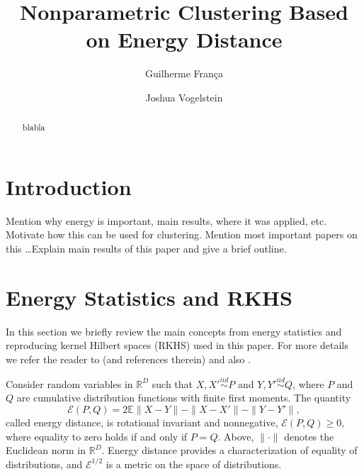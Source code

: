 \documentclass[aps,preprint,nofootinbib,floatfix]{revtex4-1}
\def\Energy{\mathcal{E}}
\def\E{\mathbb{E}}
\begin{document}
\title{Nonparametric Clustering Based on Energy Distance}

\author{Guilherme Fran\c ca}

\author{Joshua Vogelstein}


\begin{abstract}
blabla
\end{abstract}


\maketitle

\section{Introduction}

Mention why energy is important, main results, where it was applied, etc.
Motivate how this can be used for clustering. Mention most important
papers on this \ldots Explain main results of this paper and give a brief
outline.

\section{Energy Statistics and RKHS}

In this section we briefly review the main concepts from energy
statistics and reproducing kernel Hilbert spaces (RKHS) used in this paper. 
For more details we refer the reader
to \cite{Szkely2013} (and references therein) and also \cite{Sejdinovic2013}.

Consider random variables in $\mathbb{R}^D$ 
such that $X,X' \stackrel{iid}{\sim} P$ and 
$Y,Y' \stackrel{iid}{\sim} Q$, where $P$ and $Q$ are cumulative
distribution functions with finite first moments. 
The quantity \cite{Szkely2013}
\begin{equation}\label{eq:energy}
\Energy(P, Q) = 2 \E \| X - Y\| - \| X - X' \| - \| Y - Y' \|,
\end{equation}
called energy distance, 
is rotational invariant and nonnegative, $\Energy(P,Q) \ge 0$, where
equality
to zero holds if and only if $P = Q$.
Above, $\| \cdot \|$ denotes the
Euclidean norm in $\mathbb{R}^D$. 
Energy distance
provides a characterization of equality of distributions, and
$\Energy^{1/2}$ is
a metric on the space of distributions.
\end{document}
